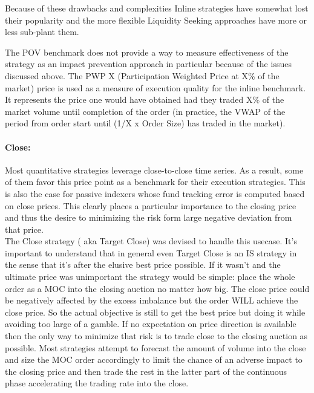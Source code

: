 Because of these drawbacks and complexities Inline strategies have somewhat lost their popularity and the more flexible Liquidity Seeking approaches  have more or less sub-plant them.

The POV benchmark does not provide a way to measure effectiveness of the strategy as an impact prevention approach in particular because of the issues discussed above. The PWP X (Participation Weighted Price at X\% of the market) price is used as a measure of execution quality for the inline benchmark. It represents the price one would have obtained had they traded X\% of the market volume until completion of the order (in practice, the VWAP of the period from order start until (1/X x Order Size) has traded in the market).


\paragraph{Close:} 

Most quantitative strategies leverage close-to-close time series. As a result, some of them favor this price point as a benchmark for their execution strategies. This is also the case for passive indexers whose fund tracking error is computed based on close prices. This clearly places a particular importance to the closing price and thus the desire to minimizing the risk form large negative deviation from that price. \\

The Close strategy ( aka Target Close) was devised to handle this usecase. It's important to understand that in general even Target Close is an IS strategy in the sense that it's after the elusive best price possible. If it wasn't and the ultimate price was unimportant the strategy would be simple: place the whole order as a MOC into the closing auction no matter how big. The close price could be negatively affected by the excess imbalance but the order WILL achieve the close price. So the actual objective is still to get the best price but doing it while avoiding too large of a gamble. If no expectation on price direction is available then the only way to minimize that risk is to trade close to the closing auction as possible. Most strategies attempt to forecast the amount of volume into the close and size the MOC order accordingly to limit the chance of an adverse impact to the closing price and then trade the rest in the latter part of the continuous phase accelerating the trading rate into the close.


